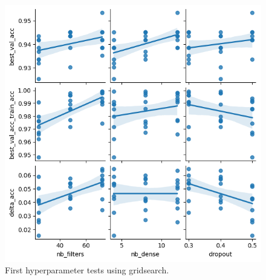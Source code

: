 \begin{figure}[H]
    \centering
    \includegraphics[width=.8\textwidth]{plots/FirstHyperparameterTests.png}
    \caption{First hyperparameter tests using gridsearch.}
    \label{fig:FirstHyperparameterTests}
\end{figure}
